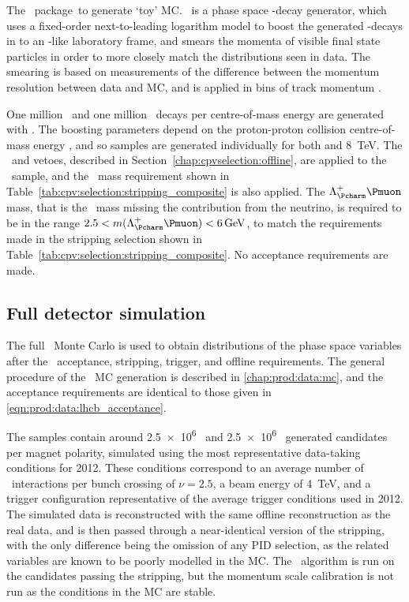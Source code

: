 The \rapidsim\ package\footnotemark\ to generate `toy' \ac{MC}.
\rapidsim\ is a phase space \Pbottom-decay generator, which uses a fixed-order
next-to-leading logarithm model to boost the generated \Pbottom-decays in to an 
\lhcb-like laboratory frame, and smears the momenta of visible final state 
particles in order to more closely match the distributions seen in data.
The smearing is based on measurements of the difference between the momentum
resolution between data and \ac{MC}, and is applied in bins of track momentum 
\ptot.


One million \LcTopKK\ and one million \LcToppipi\ decays per
centre-of-mass energy are generated with \rapidsim.
The boosting parameters depend on the proton-proton collision centre-of-mass
energy \sqrts, and so samples are generated individually for both  
and \SI{8}{\TeV}.
The \PLambda\ and \PKshort vetoes, described in 
Section~\ref{chap:cpvselection:offline}, are
applied to the \LcToppipi\ sample, and the \PLambdab\ mass requirement shown in 
Table~\ref{tab:cpv:selection:stripping_composite} is also applied.
The $\PLambdac\Pmuon$ mass, that is the \PLambdab\ mass missing the 
contribution from the neutrino, is required to be in the range $2.5 < 
m(\PLambdac\Pmuon) < \SI{6}{\GeV}$, to match the requirements made in the 
stripping selection shown in Table~\ref{tab:cpv:selection:stripping_composite}.
No acceptance requirements are made.

\subsection{Full detector simulation}
\label{chap:cpv:data:mc:full}

The full \lhcb\ Monte Carlo is used to obtain distributions of the phase space 
variables after the \lhcb\ acceptance, stripping, trigger, and offline 
requirements.
The general procedure of the \lhcb\ \ac{MC} generation is described in 
\cref{chap:prod:data:mc}, and the acceptance requirements are identical to 
those given in \cref{eqn:prod:data:lhcb_acceptance}.

The samples contain around \num{2.5e6} \pKK\ and \num{2.5e6} \ppipi\ generated 
candidates per magnet polarity, simulated using the most representative 
data-taking conditions for 2012.
These conditions correspond to an average number of \pp\ interactions per bunch 
crossing of $\nu = 2.5$, a beam energy of \SI{4}{\TeV}, and a trigger 
configuration representative of the average trigger conditions used in 2012.
The simulated data is reconstructed with the same offline reconstruction as the 
real data, and is then passed through a near-identical version of the 
stripping, with the only difference being the omission of any \ac{PID} 
selection, as the related variables are known to be poorly modelled in the 
\ac{MC}.
The \decaytreefitter\ algorithm is run on the candidates passing the stripping, 
but the momentum scale calibration is not run as the conditions in the \ac{MC} 
are stable.

